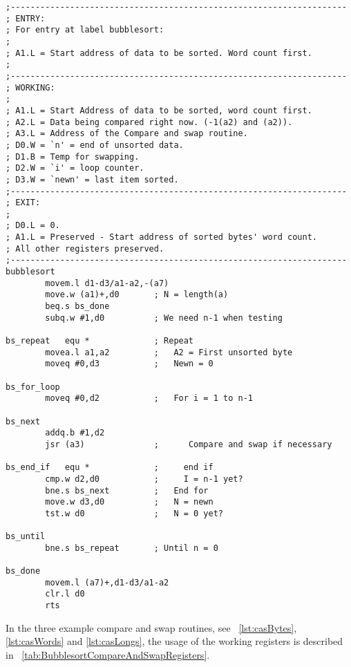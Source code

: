 \begin{lstlisting}[firstnumber=51,caption={Better Bubblesort}]
;--------------------------------------------------------------------
; ENTRY:
; For entry at label bubblesort:
;
; A1.L = Start address of data to be sorted. Word count first.
;
;--------------------------------------------------------------------
; WORKING:
;
; A1.L = Start Address of data to be sorted, word count first.
; A2.L = Data being compared right now. (-1(a2) and (a2)).
; A3.L = Address of the Compare and swap routine.
; D0.W = `n' = end of unsorted data.
; D1.B = Temp for swapping.
; D2.W = `i' = loop counter.
; D3.W = `newn' = last item sorted.
;--------------------------------------------------------------------
; EXIT:
;
; D0.L = 0.
; A1.L = Preserved - Start address of sorted bytes' word count.
; All other registers preserved.
;--------------------------------------------------------------------
bubblesort
        movem.l d1-d3/a1-a2,-(a7)
        move.w (a1)+,d0       ; N = length(a)
        beq.s bs_done
        subq.w #1,d0          ; We need n-1 when testing

bs_repeat   equ *             ; Repeat
        movea.l a1,a2         ;   A2 = First unsorted byte
        moveq #0,d3           ;   Newn = 0

bs_for_loop 
        moveq #0,d2           ;   For i = 1 to n-1

bs_next
        addq.b #1,d2
        jsr (a3)              ;      Compare and swap if necessary

bs_end_if   equ *             ;     end if
        cmp.w d2,d0           ;     I = n-1 yet?
        bne.s bs_next         ;   End for
        move.w d3,d0          ;   N = newn
        tst.w d0              ;   N = 0 yet?

bs_until
        bne.s bs_repeat       ; Until n = 0

bs_done
        movem.l (a7)+,d1-d3/a1-a2
        clr.l d0
        rts
\end{lstlisting}

In the three example compare and swap routines, see \lstlistingname~\ref{lst:casBytes}, \ref{lst:casWords} and \ref{lst:casLongs}, the usage of the working registers is described in \tablename{~\ref{tab:BubblesortCompareAndSwapRegisters}}.

